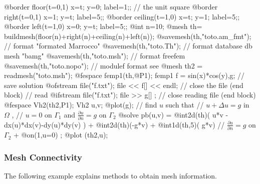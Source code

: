 \documentclass[a4paper,twoside,12pt]{book}
\def\p{\partial}
\begin{document}
\eFF

\begin{example}
\bFF

@border floor(t=0,1){ x=t; y=0; label=1;}; // the unit square
@border right(t=0,1){ x=1; y=t; label=5;};
@border ceiling(t=1,0){ x=t; y=1; label=5;};
@border left(t=1,0){ x=0; y=t; label=5;};
@int n=10;
@mesh th= buildmesh(floor(n)+right(n)+ceiling(n)+left(n));
@savemesh(th,"toto.am_fmt");  // format "formated Marrocco" 
@savemesh(th,"toto.Th");      // format database  db mesh "bamg"   
@savemesh(th,"toto.msh");     // format freefem 
@savemesh(th,"toto.nopo");     // modulef format  see \cite{modulef}
@mesh th2 = readmesh("toto.msh");
@fespace femp1(th,@P1);
femp1 f = sin(x)*cos(y),g;
{ // save solution
@ofstream file("f.txt");
file << f[] << endl;
}  // close the file (end block)
{  // read
@ifstream file("f.txt");
file >> g[] ;
} // close reading file (end block)
@fespace Vh2(th2,P1);
Vh2 u,v;
@plot(g);
//  find $u$ such that \hfilll
// $ u + \Delta u = g $ in $\Omega $ , \hfilll
// $ u=0$ on $\Gamma_1$ and $\frac{\p u }{\p n} = g$ on $\Gamma_2$  \hfilll
@solve pb(u,v) =
    @int2d(th)( u*v - dx(u)*dx(v)-dy(u)*dy(v) )
  + @int2d(th)(-g*v)
  + @int1d(th,5)( g*v) //  $\frac{\p u }{\p n} = g$ on $\Gamma_2$
  + @on(1,u=0) ;
@plot (th2,u);
\eFF
\end{example}

\subsubsection{Mesh Connectivity}

The following example explains methods to obtain mesh information.

\end{document}
